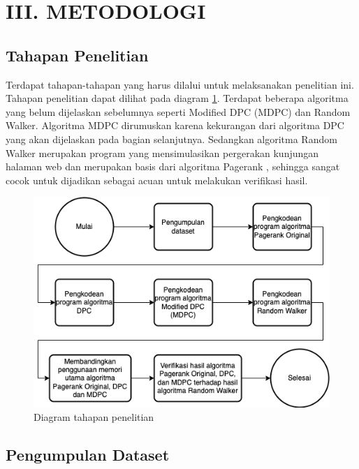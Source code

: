 \documentclass[
	a4paper, %
	12pt, %
	unnumberedsections, %
	twoside, %
]{LTJournalArticle}
\begin{document}

\section{III. METODOLOGI}

\subsection{Tahapan Penelitian}

Terdapat tahapan-tahapan yang harus dilalui untuk melaksanakan penelitian ini. Tahapan penelitian dapat dilihat pada diagram \ref{gambar:tahapan_penelitian}. Terdapat beberapa algoritma yang belum dijelaskan sebelumnya seperti Modified DPC (MDPC) dan Random Walker. Algoritma MDPC dirumuskan karena kekurangan dari algoritma DPC yang akan dijelaskan pada bagian selanjutnya. Sedangkan algoritma Random Walker merupakan program yang mensimulasikan pergerakan kunjungan halaman web dan merupakan basis dari algoritma Pagerank \citep{ilprints422}, sehingga sangat cocok untuk dijadikan sebagai acuan untuk melakukan verifikasi hasil.

\begin{figure}
	\centering
	\includegraphics[keepaspectratio, width=\linewidth]{gambar/tahapan_penelitian.png}
	\caption{Diagram tahapan penelitian}
	\label{gambar:tahapan_penelitian}
\end{figure}

\subsection{Pengumpulan Dataset}
\end{document}
